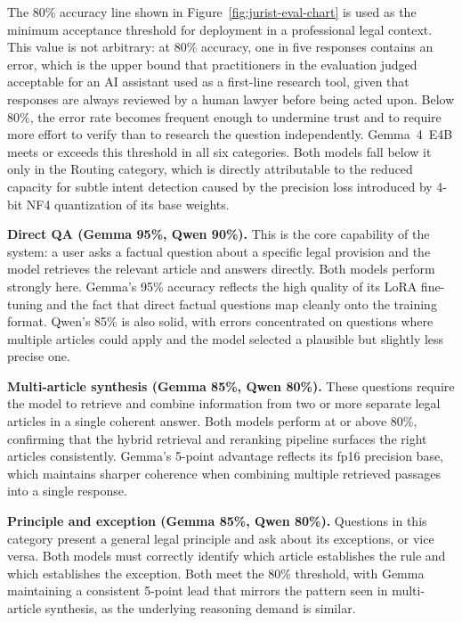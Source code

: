 The 80\% accuracy line shown in Figure~\ref{fig:jurist-eval-chart} is used as the minimum acceptance threshold for deployment in a professional legal context. This value is not arbitrary: at 80\% accuracy, one in five responses contains an error, which is the upper bound that practitioners in the evaluation judged acceptable for an AI assistant used as a first-line research tool, given that responses are always reviewed by a human lawyer before being acted upon. Below 80\%, the error rate becomes frequent enough to undermine trust and to require more effort to verify than to research the question independently. Gemma~4~E4B meets or exceeds this threshold in all six categories. Both models fall below it only in the Routing category, which is directly attributable to the reduced capacity for subtle intent detection caused by the precision loss introduced by 4-bit NF4 quantization of its base weights.

\vspace{1em}

\textbf{Direct QA (Gemma 95\%, Qwen 90\%).} This is the core capability of the system: a user asks a factual question about a specific legal provision and the model retrieves the relevant article and answers directly. Both models perform strongly here. Gemma's 95\% accuracy reflects the high quality of its LoRA fine-tuning and the fact that direct factual questions map cleanly onto the training format. Qwen's 85\% is also solid, with errors concentrated on questions where multiple articles could apply and the model selected a plausible but slightly less precise one.

\vspace{1em}

\textbf{Multi-article synthesis (Gemma 85\%, Qwen 80\%).} These questions require the model to retrieve and combine information from two or more separate legal articles in a single coherent answer. Both models perform at or above 80\%, confirming that the hybrid retrieval and reranking pipeline surfaces the right articles consistently. Gemma's 5-point advantage reflects its fp16 precision base, which maintains sharper coherence when combining multiple retrieved passages into a single response.

\vspace{1em}

\textbf{Principle and exception (Gemma 85\%, Qwen 80\%).} Questions in this category present a general legal principle and ask about its exceptions, or vice versa. Both models must correctly identify which article establishes the rule and which establishes the exception. Both meet the 80\% threshold, with Gemma maintaining a consistent 5-point lead that mirrors the pattern seen in multi-article synthesis, as the underlying reasoning demand is similar.

